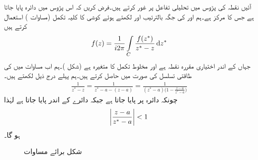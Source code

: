 آئیں نقطہ  کی پڑوس میں تحلیلی تفاعل  پر غور کرتے ہیں۔فرض کریں کہ اس پڑوس میں دائرہ  پایا جاتا ہے جس کا مرکز  ہے۔ہم  اور  کی جگہ بالترتیب  اور  لکھتے ہوئے  کوشی کا کلیہ تکمل (مساوات ) استعمال کرتے ہیں
\begin{align}\label{مساوات_ٹیلر_کوشی_کلیہ_تکمل_ٹیلر_الف}
f(z)=\frac{1}{i2\pi}\int\limits_C\frac{f(z^*)}{z^*-z}\dif z^*
\end{align}
جہاں  کے اندر  اختیاری مقررہ نقطہ ہے اور  مخلوط تکمل کا متغیرہ ہے (شکل )۔ہم اب مساوات  میں  کی طاقتی تسلسل  کی صورت میں حاصل کرتے ہیں۔ہم پہلے درج ذیل لکھتے ہیں۔
\begin{align}\label{مساوات_ٹیلر_کوشی_کلیہ_تکمل_ٹیلر_ب}
\frac{1}{z^*-z}=\frac{1}{z^*-a-(z-a)}=\frac{1}{(z^*-a)\big(1-\frac{z-a}{z^*-a}\big)}
\end{align}
چونکہ  دائرہ  پر پایا جاتا ہے جبکہ  دائرے کے اندر پایا جاتا ہے لہٰذا
\begin{align}\label{مساوات_ٹیلر_کوشی_کلیہ_تکمل_ٹیلر_پ}
\abs{\frac{z-a}{z^*-a}}<1
\end{align}
ہو گا۔
\begin{figure}
\centering
{}
\caption{شکل برائے مساوات }
\label{شکل_مساوات_ٹیلر_کوشی_کلیہ_تکمل_ٹیلر_الف}
\end{figure}

